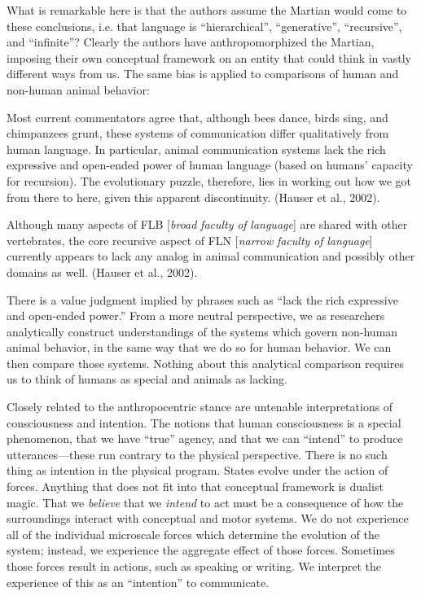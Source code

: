   What is remarkable here is that the authors assume the Martian would come to these conclusions, i.e. that language is “hierarchical”, “generative”, “recursive”, and “infinite”? Clearly the authors have anthropomorphized the Martian, imposing their own conceptual framework on an entity that could think in vastly different ways from us. The same bias is applied to comparisons of human and non-human animal behavior:

Most current commentators agree that, although bees dance, birds sing, and chimpanzees grunt, these systems of communication differ qualitatively from human language. In particular, animal communication systems lack the rich expressive and open-ended power of human language (based on humans' capacity for recursion). The evolutionary puzzle, therefore, lies in working out how we got from there to here, given this apparent discontinuity. (Hauser et al., 2002).

Although many aspects of FLB [\textit{broad} \textit{faculty} \textit{of} \textit{language}] are shared with other vertebrates, the core recursive aspect of FLN [\textit{narrow} \textit{faculty} \textit{of} \textit{language}] currently appears to lack any analog in animal communication and possibly other domains as well. (Hauser et al., 2002).

  There is a value judgment implied by phrases such as “lack the rich expressive and open-ended power.” From a more neutral perspective, we as researchers analytically construct understandings of the systems which govern non-human animal behavior, in the same way that we do so for human behavior. We can then compare those systems. Nothing about this analytical comparison requires us to think of humans as special and animals as lacking.

  Closely related to the anthropocentric stance are untenable interpretations of consciousness and intention. The notions that human consciousness is a special phenomenon, that we have “true” agency, and that we can “intend” to produce utterances—these run contrary to the physical perspective. There is no such thing as intention in the physical program. States evolve under the action of forces. Anything that does not fit into that conceptual framework is dualist magic. That we \textit{believe} that we \textit{intend} to act must be a consequence of how the surroundings interact with conceptual and motor systems. We do not experience all of the individual microscale forces which determine the evolution of the system; instead, we experience the aggregate effect of those forces.  Sometimes those forces result in actions, such as speaking or writing. We interpret the experience of this as an “intention” to communicate.


